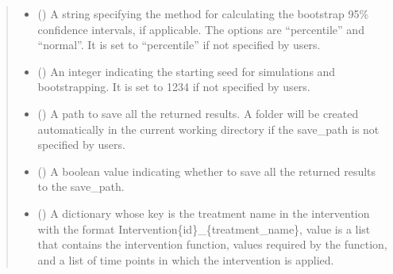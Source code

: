 \documentclass[letterpaper,10pt,english]{sphinxmanual}
\begin{document}
\begin{fulllineitems}
\begin{quote}
\begin{description}
\begin{itemize}
\item {} 
\sphinxAtStartPar
{} (\sphinxstyleliteralemphasis{\sphinxupquote{, }}) \textendash{} A string specifying the method for calculating the bootstrap 95\% confidence intervals, if applicable.
The options are “percentile” and “normal”. It is set to “percentile” if not specified by users.

\item {} 
\sphinxAtStartPar
{} (\sphinxstyleliteralemphasis{\sphinxupquote{, }}) \textendash{} An integer indicating the starting seed for simulations and bootstrapping. It is set to 1234 if not specified by users.

\item {} 
\sphinxAtStartPar
{} (\sphinxstyleliteralemphasis{\sphinxupquote{, }}) \textendash{} A path to save all the returned results. A folder will be created automatically in the current working directory
if the save\_path is not specified by users.

\item {} 
\sphinxAtStartPar
{} (\sphinxstyleliteralemphasis{\sphinxupquote{, }}) \textendash{} A boolean value indicating whether to save all the returned results to the save\_path.

\item {} 
\sphinxAtStartPar
{} (\sphinxstyleliteralemphasis{\sphinxupquote{, }}) \textendash{} A dictionary whose key is the treatment name in the intervention with the format Intervention\{id\}\_\{treatment\_name\},
value is a list that contains the intervention function, values required by the function, and a list of time
points in which the intervention is applied.

\end{itemize}

\end{description}\end{quote}

\end{fulllineitems}
\end{document}
